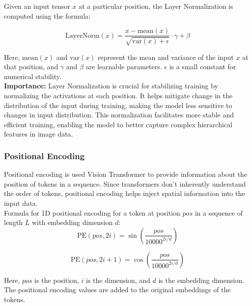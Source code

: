 Given an input tensor $x$ at a particular position, the Layer Normalization is computed using the formula:

\begin{equation}
    \text{LayerNorm}(x) = \frac{x - \text{mean}(x)}{\sqrt{\text{var}(x) + \epsilon}} \cdot \gamma + \beta \label{eq:layer_norm}
\end{equation}


Here, $\text{mean}(x)$ and $\text{var}(x)$ represent the mean and variance of the input $x$ at that position, and $\gamma$ and $\beta$ are learnable parameters. $\epsilon$ is a small constant for numerical stability.\\

\textbf{Importance:}
Layer Normalization is crucial for stabilizing training by normalizing the activations at each position. It helps mitigate change in the distribution of the input during training, making the model less sensitive to changes in input distribution. This normalization facilitates more stable and efficient training, enabling the model to better capture complex hierarchical features in image data.\\

\subsubsection{Positional Encoding}
Positional encoding is used Vision Transformer to provide information about the position of tokens in a sequence. Since transformers don't inherently understand the order of tokens, positional encoding helps inject spatial information into the input data.\\

Formula for 1D positional encoding for a token at position $pos$ in a sequence of length $L$ with embedding dimension $d$:\\

\begin{equation}
    \text{PE}(pos, 2i) = \sin\left(\frac{pos}{10000^{2i/d}}\right) \label{eq:pos_encoding_sin}
\end{equation}

\begin{equation}
    \text{PE}(pos, 2i+1) = \cos\left(\frac{pos}{10000^{2i/d}}\right) \label{eq:pos_encoding_cos}
\end{equation}


Here, $pos$ is the position, $i$ is the dimension, and $d$ is the embedding dimension. The positional encoding values are added to the original embeddings of the tokens.\\

